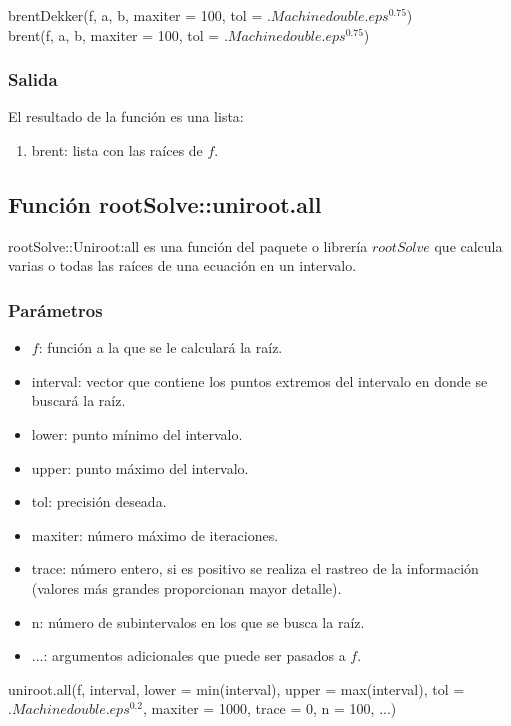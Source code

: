 \documentclass[a4paper,12pt]{article}
\begin{document}
brentDekker(f, a, b, maxiter = 100, tol = $.Machinedouble.eps^0.75$) \\
brent(f, a, b, maxiter = 100, tol = $.Machinedouble.eps^0.75$)

\subsubsection{Salida}

El resultado de la función es una lista:
\begin{enumerate}
    \item brent: lista con las raíces de $f$.
\end{enumerate}

\subsection{Función rootSolve::uniroot.all}
rootSolve::Uniroot:all es una función del paquete o librería $rootSolve$ que calcula varias o todas las raíces de una ecuación en un intervalo.


\subsubsection{Parámetros}
\begin{itemize}
    \item $f$: función a la que se le calculará la raíz.
    \item interval:  vector que contiene los puntos extremos del intervalo en donde se buscará la raíz.
    \item lower: punto mínimo del intervalo.
    \item upper: punto máximo del intervalo.
    \item tol: precisión deseada.
    \item maxiter: número máximo de iteraciones.
    \item trace: número entero, si es positivo se realiza el rastreo de la información (valores más grandes proporcionan mayor detalle).
    \item n: número de subintervalos en los que se busca la raíz.
    \item ...: argumentos adicionales que puede ser pasados a $f$.
\end{itemize}

uniroot.all(f, interval, lower = min(interval), upper = max(interval), 
            tol = $.Machinedouble.eps^0.2$, maxiter = 1000, 
            trace = 0, n = 100, ...)
\end{document}
